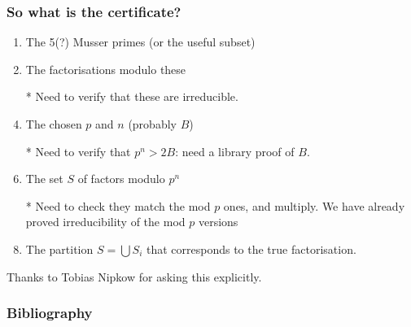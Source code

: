 \documentclass[handout]{beamer}   %
\begin{document}
\begin{frame}[fragile]
\frametitle{So what is the certificate?}
\pause
\begin{enumerate}[<+->]
\item The 5(?) Musser primes (or the useful subset)
\item The factorisations modulo these
\item[*]Need to verify that these are irreducible.
\item The chosen $p$ and $n$ (probably $B$)
\item[*]Need to verify that $p^n>2B$: need a library proof of $B$.
\item The set $S$ of factors modulo $p^n$
\item[*]Need to check they match the mod $p$ ones, and multiply. We have already proved irreducibility of the mod $p$ versions
\item The partition $S=\bigcup S_i$ that corresponds to the true factorisation.
\end{enumerate}
\pause
Thanks to Tobias Nipkow for asking this explicitly.
\end{frame}
\iffalse
\begin{frame}[fragile]
\frametitle{Further Reflections}
\begin{enumerate}
\item[M]Take five $p$ and compare the factorisations.
\end{enumerate}
\pause
Not just ``take the best''. \pause Rather we look for incompatibilities, so if a degree 4 factors as 3,1 modulo one prime and 2,2 modulo another, it's actually irreducible, and so on.
\par\pause
\cite{Musser1975a} suggests taking five primes, though more recently \cite{LuczakPyber1997} show that, if the Galois group is $S_n$, seven is asymptotically right.
\par\pause
For any degree $d$, the probability that a random polynomial with coefficients $\le H$ has Galois group $S_n$ tends to 1 as $H$ tends to infinity. \pause \cite{DavenportSmith2000} looks at other Galois groups.
\end{frame}
\fi

\begin{frame}[allowframebreaks]
\frametitle{Bibliography}

\end{frame}
\end{document}

